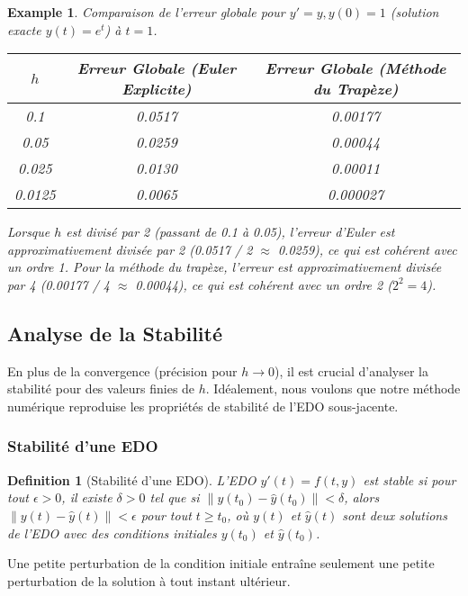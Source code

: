 \documentclass{article}
\newtheorem{definition}{Definition}
\newtheorem{example}{Example}
\begin{document}
\begin{example}
Comparaison de l'erreur globale pour $y' = y, y(0)=1$ (solution exacte $y(t)=e^t$) à $t=1$.
\begin{center}
\begin{tabular}{|c|c|c|}
\hline
$h$ & Erreur Globale (Euler Explicite) & Erreur Globale (Méthode du Trapèze) \\
\hline
0.1   & 0.0517 & 0.00177 \\
0.05  & 0.0259 & 0.00044 \\
0.025 & 0.0130 & 0.00011 \\
0.0125 & 0.0065 & 0.000027 \\
\hline
\end{tabular}
\end{center}

Lorsque $h$ est divisé par 2 (passant de 0.1 à 0.05), l'erreur d'Euler est approximativement divisée par 2 (0.0517 / 2 $\approx$ 0.0259), ce qui est cohérent avec un ordre 1.
Pour la méthode du trapèze, l'erreur est approximativement divisée par 4 (0.00177 / 4 $\approx$ 0.00044), ce qui est cohérent avec un ordre 2 ($2^2=4$).
\end{example}

\subsection*{Analyse de la Stabilité}

En plus de la convergence (précision pour $h \to 0$), il est crucial d'analyser la stabilité pour des valeurs finies de $h$. Idéalement, nous voulons que notre méthode numérique reproduise les propriétés de stabilité de l'EDO sous-jacente.

\subsubsection*{Stabilité d'une EDO}

\begin{definition}[Stabilité d'une EDO]
L'EDO $y'(t) = f(t, y)$ est stable si pour tout $\epsilon > 0$, il existe $\delta > 0$ tel que si $\|y(t_0) - \hat{y}(t_0)\| < \delta$, alors $\|y(t) - \hat{y}(t)\| < \epsilon$ pour tout $t \ge t_0$, où $y(t)$ et $\hat{y}(t)$ sont deux solutions de l'EDO avec des conditions initiales $y(t_0)$ et $\hat{y}(t_0)$.
\end{definition}
Une petite perturbation de la condition initiale entraîne seulement une petite perturbation de la solution à tout instant ultérieur.
\end{document}
